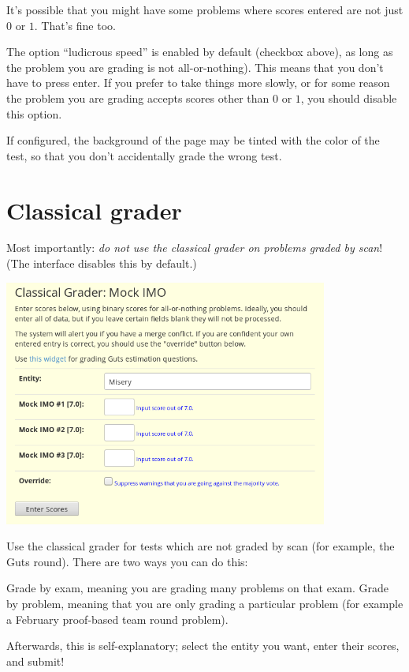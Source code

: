 It's possible that you might have some problems
where scores entered are not just $0$ or $1$.
That's fine too.

The option ``ludicrous speed'' is enabled by default (checkbox above),
as long as the problem you are grading is not all-or-nothing).
This means that you don't have to press enter.
If you prefer to take things more slowly,
or for some reason the problem you are grading accepts
scores other than $0$ or $1$,
you should disable this option.

If configured, the background of the page may be tinted
with the color of the test, so that you don't accidentally grade
the wrong test.

\section{Classical grader}
Most importantly:
\emph{do not use the classical grader on problems graded by scan}!
(The interface disables this by default.)

\begin{center}
	\includegraphics[width=0.8\textwidth]{images/classicgrade.png}
\end{center}

Use the classical grader for tests which are not graded by scan
(for example, the Guts round).
There are two ways you can do this:
\begin{itemize}
	\ii Grade by exam, meaning you are grading many problems on that exam.
	\ii Grade by problem, meaning that you are only grading 
	a particular problem (for example a February proof-based team round problem).
\end{itemize}
Afterwards, this is self-explanatory;
select the entity you want, enter their scores, and submit!

